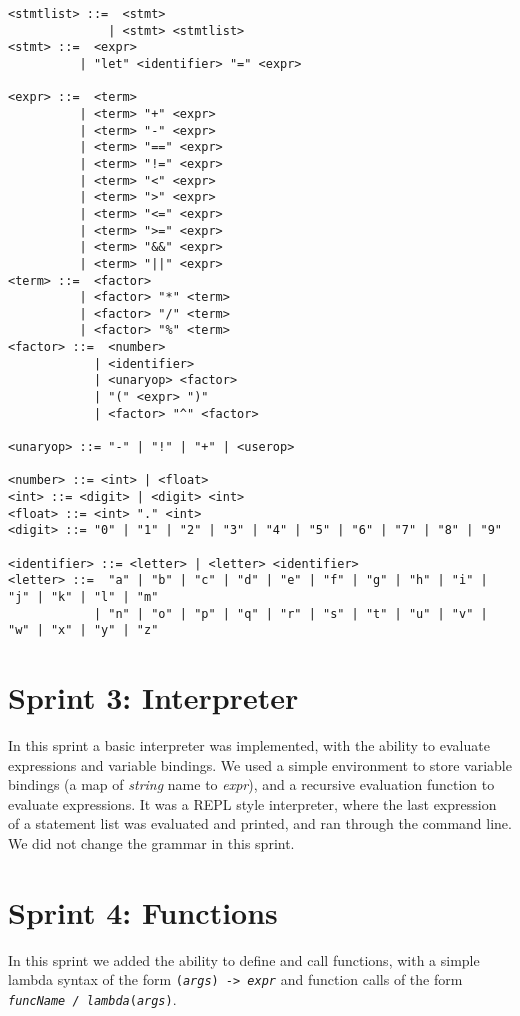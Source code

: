 \begin{verbatim}
<stmtlist> ::=  <stmt> 
              | <stmt> <stmtlist>
<stmt> ::=  <expr> 
          | "let" <identifier> "=" <expr>

<expr> ::=  <term> 
          | <term> "+" <expr> 
          | <term> "-" <expr>
          | <term> "==" <expr>
          | <term> "!=" <expr>
          | <term> "<" <expr>
          | <term> ">" <expr>
          | <term> "<=" <expr>
          | <term> ">=" <expr>
          | <term> "&&" <expr>
          | <term> "||" <expr>
<term> ::=  <factor> 
          | <factor> "*" <term> 
          | <factor> "/" <term> 
          | <factor> "%" <term> 
<factor> ::=  <number> 
            | <identifier> 
            | <unaryop> <factor>
            | "(" <expr> ")" 
            | <factor> "^" <factor>

<unaryop> ::= "-" | "!" | "+" | <userop>

<number> ::= <int> | <float>
<int> ::= <digit> | <digit> <int>
<float> ::= <int> "." <int>
<digit> ::= "0" | "1" | "2" | "3" | "4" | "5" | "6" | "7" | "8" | "9"

<identifier> ::= <letter> | <letter> <identifier>
<letter> ::=  "a" | "b" | "c" | "d" | "e" | "f" | "g" | "h" | "i" | "j" | "k" | "l" | "m" 
            | "n" | "o" | "p" | "q" | "r" | "s" | "t" | "u" | "v" | "w" | "x" | "y" | "z"
\end{verbatim}

\section{Sprint 3: Interpreter}\label{sec:interpreter}

In this sprint a basic interpreter was implemented, with the ability to evaluate expressions and variable bindings.
We used a simple environment to store variable bindings (a map of \textit{string} name to \textit{expr}), and a 
recursive evaluation function to evaluate expressions.
It was a REPL style interpreter, where the last expression of a statement list was evaluated and printed, and ran through
the command line.
We did not change the grammar in this sprint.

\section{Sprint 4: Functions}\label{sec:functions}

In this sprint we added the ability to define and call functions, with a simple lambda syntax of the form 
\texttt{(\textit{args}) -> \textit{expr}} and function calls of the form \texttt{\textit{funcName / lambda}(\textit{args})}.

